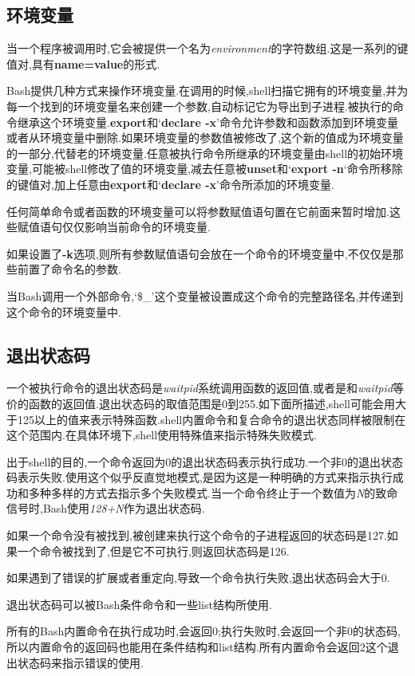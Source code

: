 \documentclass[draft,openany]{book}
\begin{document}
\begin{CJK}{UTF8}{gbsn}
    \subsection{环境变量}
    当一个程序被调用时,它会被提供一个名为\emph{environment}的字符数组.这是一系列的键值对,具有\textbf{name=value}的形式.\par
    Bash提供几种方式来操作环境变量.在调用的时候,shell扫描它拥有的环境变量,并为每一个找到的环境变量名来创建一个参数,自动标记它为导出到子进程.被执行的命令继承这个环境变量.\textbf{export}和`\textbf{declare -x}'命令允许参数和函数添加到环境变量或者从环境变量中删除.如果环境变量的参数值被修改了,这个新的值成为环境变量的一部分,代替老的环境变量.任意被执行命令所继承的环境变量由shell的初始环境变量,可能被shell修改了值的环境变量,减去任意被\textbf{unset}和`\textbf{export -n}`命令所移除的键值对,加上任意由\textbf{export}和`\textbf{declare -x}'命令所添加的环境变量.\par
    任何简单命令或者函数的环境变量可以将参数赋值语句置在它前面来暂时增加.这些赋值语句仅仅影响当前命令的环境变量.\par
    如果设置了\textbf{-k}选项,则所有参数赋值语句会放在一个命令的环境变量中,不仅仅是那些前置了命令名的参数.\par
    当Bash调用一个外部命令,`\$\_'这个变量被设置成这个命令的完整路径名,并传递到这个命令的环境变量中.

    \subsection{退出状态码}
    一个被执行命令的退出状态码是\emph{waitpid}系统调用函数的返回值,或者是和\emph{waitpid}等价的函数的返回值.退出状态码的取值范围是0到255.如下面所描述,shell可能会用大于125以上的值来表示特殊函数.shell内置命令和复合命令的退出状态同样被限制在这个范围内.在具体环境下,shell使用特殊值来指示特殊失败模式.\par
    出于shell的目的,一个命令返回为0的退出状态码表示执行成功.一个非0的退出状态码表示失败.使用这个似乎反直觉地模式,是因为这是一种明确的方式来指示执行成功和多种多样的方式去指示多个失败模式.当一个命令终止于一个数值为\emph{N}的致命信号时,Bash使用\emph{128+N}作为退出状态码.\par
    如果一个命令没有被找到,被创建来执行这个命令的子进程返回的状态码是127.如果一个命令被找到了,但是它不可执行,则返回状态码是126.\par
    如果遇到了错误的扩展或者重定向,导致一个命令执行失败,退出状态码会大于0.\par
    退出状态码可以被Bash条件命令和一些list结构所使用.\par
    所有的Bash内置命令在执行成功时,会返回0;执行失败时,会返回一个非0的状态码,所以内置命令的返回码也能用在条件结构和list结构.所有内置命令会返回2这个退出状态码来指示错误的使用.


\end{CJK}
\end{document}
